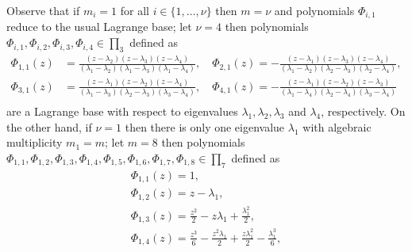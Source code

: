 \begin{remark}
Observe that if $m_{i}=1$ for all $i\in\lbrace 1, \ldots, \nu\rbrace$ then $m=\nu$
and polynomials $\Phi_{i,1}$ reduce to the usual Lagrange base;
let $\nu=4$ then polynomials
$\Phi_{i,1},\Phi_{i,2},\Phi_{i,3},\Phi_{i,4} \in\prod_{3}$ defined as 
\begin{displaymath}
\begin{split}
\Phi_{ 1, 1 }{\left (z \right )} &= \frac{\left(z - \lambda_{2}\right)
\left(z - \lambda_{3}\right) \left(z - \lambda_{4}\right)}{\left(\lambda_{1} -
\lambda_{2}\right) \left(\lambda_{1} - \lambda_{3}\right) \left(\lambda_{1} -
\lambda_{4}\right)}, \quad 
\Phi_{ 2, 1 }{\left (z \right )} = - \frac{\left(z -
\lambda_{1}\right) \left(z - \lambda_{3}\right) \left(z -
\lambda_{4}\right)}{\left(\lambda_{1} - \lambda_{2}\right) \left(\lambda_{2} -
\lambda_{3}\right) \left(\lambda_{2} - \lambda_{4}\right)}, \\
\Phi_{ 3, 1 }{\left (z \right )} &= \frac{\left(z - \lambda_{1}\right) \left(z -
\lambda_{2}\right) \left(z - \lambda_{4}\right)}{\left(\lambda_{1} -
\lambda_{3}\right) \left(\lambda_{2} - \lambda_{3}\right) \left(\lambda_{3} -
\lambda_{4}\right)}, \quad
\Phi_{ 4, 1 }{\left (z \right )} = - \frac{\left(z -
\lambda_{1}\right) \left(z - \lambda_{2}\right) \left(z -
\lambda_{3}\right)}{\left(\lambda_{1} - \lambda_{4}\right) \left(\lambda_{2} -
\lambda_{4}\right) \left(\lambda_{3} - \lambda_{4}\right)}\\
\end{split}
\end{displaymath}
are a Lagrange base with respect to eigenvalues $\lambda_{1},
\lambda_{2},\lambda_{3}$ and $\lambda_{4}$, respectively.  On the other hand,
if $\nu=1$ then there is only one eigenvalue $\lambda_{1}$ with algebraic
    multiplicity $m_{1}=m$; let $m=8$ then polynomials
    $\Phi_{1,1},\Phi_{1,2},\Phi_{1,3},\Phi_{1,4},\Phi_{1,5},\Phi_{1,6},\Phi_{1,7},\Phi_{1,8}\in\prod_{7}$
    defined as
\begin{equation}
\begin{array}{c}
\Phi_{ 1, 1 }{\left (z \right )} = 1, \\ 
\Phi_{ 1, 2 }{\left (z \right )} = z - \lambda_{1}, \\ 
\Phi_{ 1, 3 }{\left (z \right )} = \frac{z^{2}}{2} - z \lambda_{1} + \frac{\lambda_{1}^{2}}{2},\\ 
\Phi_{ 1, 4 }{\left (z \right )} = \frac{z^{3}}{6} - \frac{z^{2} \lambda_{1}}{2} + \frac{z \lambda_{1}^{2}}{2} - \frac{\lambda_{1}^{3}}{6}, \\ 

\end{array}
\end{equation}
\end{remark}
